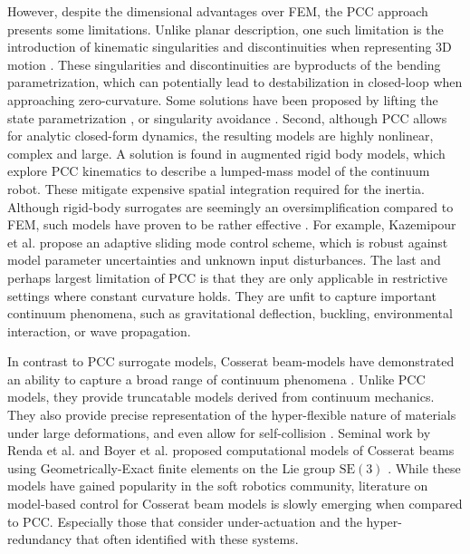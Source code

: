 However, despite the dimensional advantages over FEM, the PCC approach presents some limitations. Unlike planar description, one such limitation is the introduction of kinematic singularities and discontinuities when representing 3D motion \cite{Jones2006,Jones2007Apr}. These singularities and discontinuities are byproducts of the bending parametrization, which can potentially lead to destabilization in closed-loop when approaching zero-curvature. Some solutions have been proposed by lifting the state parametrization \cite{DellaSantina2020Jan}, or singularity avoidance \cite{Falkenhahn2015,Tatlicioglu2007}. Second, although PCC allows for analytic closed-form dynamics, the resulting models are highly nonlinear, complex and large. A solution is found in augmented rigid body models, which explore PCC kinematics to describe a lumped-mass model of the continuum robot. These mitigate  expensive spatial integration required for the inertia. Although rigid-body surrogates are seemingly an oversimplification compared to FEM, such models have proven to be rather effective \cite{DellaSantina2020, Kazemipour2022May, Katzschmann2019,Franco2020,Franco2022}. For example, Kazemipour et al. \cite{Kazemipour2022May} propose an adaptive sliding mode control scheme, which is robust against model parameter uncertainties and unknown input disturbances. The last and perhaps largest limitation of PCC is that they are only applicable in restrictive settings where constant curvature holds. They are unfit to capture important continuum phenomena, such as gravitational deflection, buckling, environmental interaction, or wave propagation.

In contrast to PCC surrogate models, Cosserat beam-models have demonstrated an ability to capture a broad range of continuum phenomena \cite{Gazzola2018,Renda2017Aug,Renda2018,Boyer2010,Till2019}. Unlike PCC models, they provide truncatable models derived from continuum mechanics. They also provide precise representation of the hyper-flexible nature of materials under large deformations, and even allow for self-collision \cite{Gazzola2018}. Seminal work by Renda et al. \cite{Renda2018,Renda2020} and Boyer et al. \cite{Boyer2021} proposed computational models of Cosserat beams using Geometrically-Exact finite elements on the Lie group $\textrm{SE}(3)$ \cite{Simo1986}. While these models have gained popularity in the soft robotics community, literature on model-based control for Cosserat beam models is slowly emerging when compared to PCC. Especially those that consider under-actuation and the hyper-redundancy that often identified with these systems.